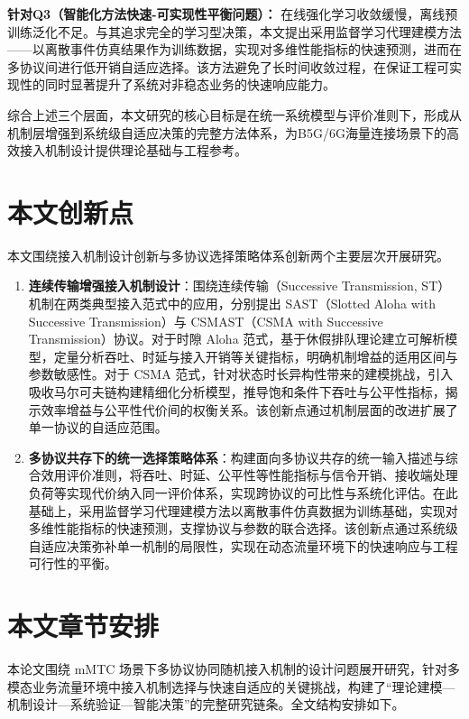 \noindent\textbf{针对Q3（智能化方法快速-可实现性平衡问题）：}
在线强化学习收敛缓慢，离线预训练泛化不足。与其追求完全的学习型决策，本文提出采用监督学习代理建模方法——以离散事件仿真结果作为训练数据，实现对多维性能指标的快速预测，进而在多协议间进行低开销自适应选择。该方法避免了长时间收敛过程，在保证工程可实现性的同时显著提升了系统对非稳态业务的快速响应能力。

综合上述三个层面，本文研究的核心目标是在统一系统模型与评价准则下，形成从机制层增强到系统级自适应决策的完整方法体系，为B5G/6G海量连接场景下的高效接入机制设计提供理论基础与工程参考。

\section{本文创新点}
\label{sec:contributions}

本文围绕接入机制设计创新与多协议选择策略体系创新两个主要层次开展研究。

\begin{enumerate}
	\item \textbf{连续传输增强接入机制设计}：围绕连续传输（Successive Transmission, ST）机制在两类典型接入范式中的应用，分别提出 SAST（Slotted Aloha with Successive Transmission）与 CSMAST（CSMA with Successive Transmission）协议。对于时隙 Aloha 范式，基于休假排队理论建立可解析模型，定量分析吞吐、时延与接入开销等关键指标，明确机制增益的适用区间与参数敏感性。对于 CSMA 范式，针对状态时长异构性带来的建模挑战，引入吸收马尔可夫链构建精细化分析模型，推导饱和条件下吞吐与公平性指标，揭示效率增益与公平性代价间的权衡关系。该创新点通过机制层面的改进扩展了单一协议的自适应范围。
	
	\item \textbf{多协议共存下的统一选择策略体系}：构建面向多协议共存的统一输入描述与综合效用评价准则，将吞吐、时延、公平性等性能指标与信令开销、接收端处理负荷等实现代价纳入同一评价体系，实现跨协议的可比性与系统化评估。在此基础上，采用监督学习代理建模方法以离散事件仿真数据为训练基础，实现对多维性能指标的快速预测，支撑协议与参数的联合选择。该创新点通过系统级自适应决策弥补单一机制的局限性，实现在动态流量环境下的快速响应与工程可行性的平衡。
\end{enumerate}



\section{本文章节安排}
\label{sec:structure}

本论文围绕 mMTC 场景下多协议协同随机接入机制的设计问题展开研究，针对多模态业务流量环境中接入机制选择与快速自适应的关键挑战，构建了“理论建模—机制设计—系统验证—智能决策”的完整研究链条。全文结构安排如下。

